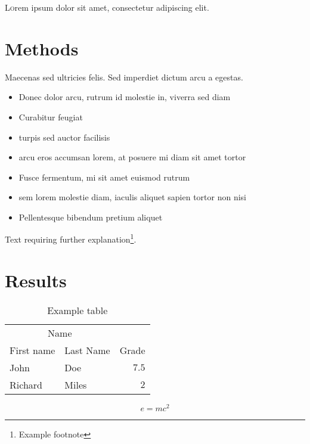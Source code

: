 \documentclass[twoside,twocolumn]{article}
\begin{document}
\lettrine[nindent=0em,lines=3]{L} orem ipsum dolor sit amet, consectetur adipiscing elit.
\blindtext %

\blindtext %


\section{Methods}

Maecenas sed ultricies felis. Sed imperdiet dictum arcu a egestas. 
\begin{itemize}
\item Donec dolor arcu, rutrum id molestie in, viverra sed diam
\item Curabitur feugiat
\item turpis sed auctor facilisis
\item arcu eros accumsan lorem, at posuere mi diam sit amet tortor
\item Fusce fermentum, mi sit amet euismod rutrum
\item sem lorem molestie diam, iaculis aliquet sapien tortor non nisi
\item Pellentesque bibendum pretium aliquet
\end{itemize}
\blindtext %

Text requiring further explanation\footnote{Example footnote}.


\section{Results}

\begin{table}
\caption{Example table}
\centering
\begin{tabular}{llr}
\toprule
\multicolumn{2}{c}{Name} \\
\cmidrule(r){1-2}
First name & Last Name & Grade \\
\midrule
John & Doe & $7.5$ \\
Richard & Miles & $2$ \\
\bottomrule
\end{tabular}
\end{table}

\blindtext %

\begin{equation}
\label{eq:emc}
e = mc^2
\end{equation}
\end{document}
